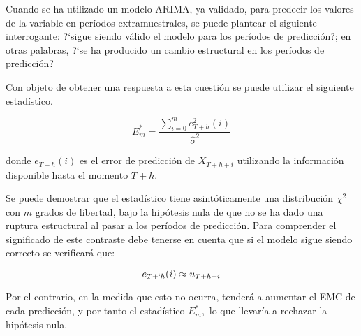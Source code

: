 Cuando se ha utilizado un modelo ARIMA, ya validado, para predecir los valores de la variable en per\'{i}odos extramuestrales, se puede plantear el siguiente interrogante: ?`sigue siendo v\'{a}lido el modelo para los per\'{i}odos de predicci\'{o}n?; en otras palabras, ?`se ha producido un cambio estructural en los per\'{i}odos de predicci\'{o}n?\newline

Con objeto de obtener una respuesta a esta cuesti\'{o}n se puede utilizar el siguiente estad\'{i}stico.

\begin{equation}\label{eq:3.05}
 E_{m}^{\ast }=\frac{\displaystyle\sum_{i=0}^m {e_{T+h}^{2}(i)} }{\widehat{\sigma}^{2}} 
\end{equation}

donde $e_{T+h}( i)$ es el error de predicci\'{o}n de $X_{T+h+i} $ utilizando la informaci\'{o}n disponible hasta el momento $T+h$.\newline

Se puede demostrar que el estad\'{i}stico tiene asint\'{o}ticamente una distribuci\'{o}n $\chi^{2}$ con $m$ grados de libertad, bajo la hip\'{o}tesis nula de que no se ha dado una ruptura estructural al pasar a los per\'{i}odos de predicci\'{o}n. Para comprender el significado de este contraste debe tenerse en cuenta que si el modelo sigue siendo correcto se verificar\'{a} que:

\[
e_{T+`h} ( i )\approx u_{T+h+i} 
\]

Por el contrario, en la medida que esto no ocurra, tender\'{a} a aumentar el EMC de cada predicci\'{o}n, y por tanto el estad\'{i}stico $E_{m}^{\ast},$ lo que llevar\'{i}a a rechazar la hip\'{o}tesis nula.

